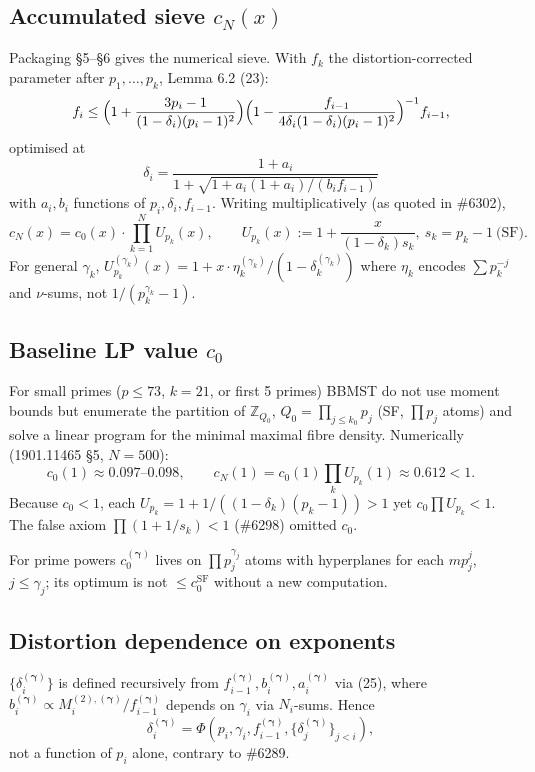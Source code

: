 \documentclass[11pt,a4paper]{article}
\theoremstyle{plain}
\theoremstyle{definition}
\theoremstyle{remark}
\newcommand{\Z}{\mathbb{Z}}
\begin{document}
\subsection{Accumulated sieve \texorpdfstring{$c_{N}(x)$}{c\_N}}

Packaging \S5--\S6 gives the numerical sieve. With $f_{k}$ the distortion-corrected parameter after $p_{1},\dots,p_{k}$, Lemma 6.2 (23):
\[
f_{i}\le\Bigl(1+\frac{3p_{i}-1}{(1-\delta_{i})(p_{i}-1)^{2}}\Bigr)\Bigl(1-\frac{f_{i-1}}{4\delta_{i}(1-\delta_{i})(p_{i}-1)^{2}}\Bigr)^{-1}f_{i-1},
\]
optimised at
\[
\delta_{i}=\frac{1+a_{i}}{1+\sqrt{1+a_{i}(1+a_{i})/(b_{i}f_{i-1})}} \tag{25}
\]
with $a_{i},b_{i}$ functions of $p_{i},\delta_{i},f_{i-1}$. Writing multiplicatively (as quoted in \#6302),
\[
c_{N}(x)=c_{0}(x)\cdot\prod_{k=1}^{N}U_{p_{k}}(x),\qquad U_{p_{k}}(x):=1+\frac{x}{(1-\delta_{k})s_{k}},\ s_{k}=p_{k}-1\ \text{(SF)}. \tag{$\star$}
\]
For general $\gamma_{k}$, $U_{p_{k}}^{(\gamma_{k})}(x)=1+x\cdot\eta_{k}^{(\gamma_{k})}/(1-\delta_{k}^{(\gamma_{k})})$ where $\eta_{k}$ encodes $\sum p_{k}^{-j}$ and $\nu$-sums, not $1/(p_{k}^{\gamma_{k}}-1)$.

\subsection{Baseline LP value \texorpdfstring{$c_{0}$}{c\_0}}

For small primes ($p\le73$, $k=21$, or first 5 primes) BBMST do not use moment bounds but enumerate the partition of $\Z_{Q_{0}}$, $Q_{0}=\prod_{j\le k_{0}}p_{j}$ (SF, $\prod p_{j}$ atoms) and solve a linear program for the minimal maximal fibre density. Numerically (1901.11465 \S5, $N=500$):
\[
c_{0}(1)\approx0.097\text{--}0.098,\qquad c_{N}(1)=c_{0}(1)\prod_{k}U_{p_{k}}(1)\approx0.612<1.
\]
Because $c_{0}<1$, each $U_{p_{k}}=1+1/((1-\delta_{k})(p_{k}-1))>1$ yet $c_{0}\prod U_{p_{k}}<1$. The false axiom $\prod(1+1/s_{k})<1$ (\#6298) omitted $c_{0}$.

For prime powers $c_{0}^{(\boldsymbol\gamma)}$ lives on $\prod p_{j}^{\gamma_{j}}$ atoms with hyperplanes for each $m p_{j}^{j}$, $j\le\gamma_{j}$; its optimum is not $\le c_{0}^{\mathrm{SF}}$ without a new computation.

\subsection{Distortion dependence on exponents}

$\{\delta_{i}^{(\boldsymbol\gamma)}\}$ is defined recursively from $f_{i-1}^{(\boldsymbol\gamma)},b_{i}^{(\boldsymbol\gamma)},a_{i}^{(\boldsymbol\gamma)}$ via (25), where $b_{i}^{(\boldsymbol\gamma)}\propto M_{i}^{(2),(\boldsymbol\gamma)}/f_{i-1}^{(\boldsymbol\gamma)}$ depends on $\gamma_{i}$ via $N_{i}$-sums. Hence
\[
\delta_{i}^{(\boldsymbol\gamma)}=\Phi(p_{i},\gamma_{i},f_{i-1}^{(\boldsymbol\gamma)},\{\delta_{j}^{(\boldsymbol\gamma)}\}_{j<i}),
\]
not a function of $p_{i}$ alone, contrary to \#6289.
\end{document}
